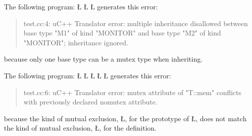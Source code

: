 \documentclass[openright,twoside]{report}
\begin{document}
The following program:
\LGinlinefalse\LGbegin\lgrinde
\L{}
\L{}
\L{}
\CE{}\endlgrinde\LGend
generates this error:
\begin{quote}
\BGfont
test.cc:4: uC++ Translator error: multiple inheritance disallowed between base type "M1" of kind "MONITOR" and base type "M2" of kind "MONITOR"; inheritance ignored.
\end{quote}
because only one base type can be a mutex type when inheriting.

The following program:
\LGinlinefalse\LGbegin\lgrinde
\L{}
\L{}
\L{\LB{}}
\L{\LB{\};}}
\L{}
\endlgrinde\LGend
generates this error:
\begin{quote}
\BGfont
test.cc:6: uC++ Translator error: mutex attribute of "T::mem" conflicts with previously declared nomutex attribute.
\end{quote}
because the kind of mutual exclusion, \LGinlinetrue\LGbegin\lgrinde\L{}\endlgrinde\LGend{}, for the prototype of \LGinlinetrue\LGbegin\lgrinde\L{}\endlgrinde\LGend{}, does not match the kind of mutual exclusion, \LGinlinetrue\LGbegin\lgrinde\L{}\endlgrinde\LGend{}, for the definition.
\end{document}
